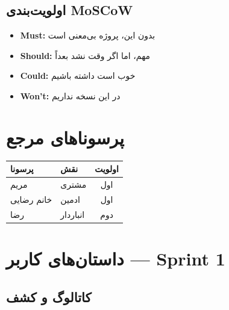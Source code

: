 \documentclass[12pt, a4paper]{article}
\begin{document}
\subsection{اولویت‌بندی MoSCoW}
\begin{itemize}
    \item \textbf{Must:} بدون این، پروژه بی‌معنی است
    \item \textbf{Should:} مهم، اما اگر وقت نشد بعداً
    \item \textbf{Could:} خوب است داشته باشیم
    \item \textbf{Won't:} در این نسخه نداریم
\end{itemize}

\section{پرسوناهای مرجع}

\begin{center}
\begin{tabular}{|l|l|c|}
\hline
\textbf{پرسونا} & \textbf{نقش} & \textbf{اولویت} \\
\hline
مریم & مشتری & اول \\
\hline
خانم رضایی & ادمین & اول \\
\hline
رضا & انباردار & دوم \\
\hline
\end{tabular}
\end{center}

\section{داستان‌های کاربر — Sprint 1}

\subsection{کاتالوگ و کشف}
\end{document}
